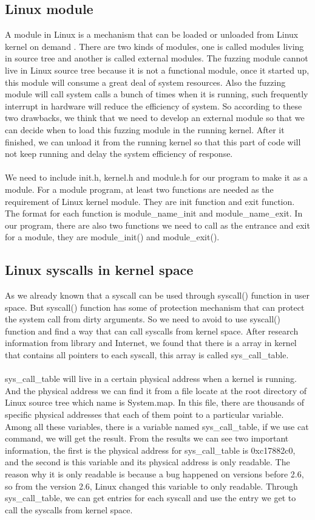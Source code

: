 \documentclass[twoside]{article}
\begin{document}
\begin{multicols}{2}
\subsection{Linux module}
A module in Linux is a mechanism that can be loaded or unloaded from Linux kernel on demand \cite{love2010linux}. There are two kinds of modules, one is called modules living in source tree and another is called external modules. The fuzzing module cannot live in Linux source tree because it is not a functional module, once it started up, this module will consume a great deal of system resources. Also the fuzzing module will call system calls a bunch of times when it is running, such frequently interrupt in hardware will reduce the efficiency of system. So according to these two drawbacks, we think that we need to develop an external module so that we can decide when to load this fuzzing module in the running kernel. After it finished, we can unload it from the running kernel so that this part of code will not keep running and delay the system efficiency of response.\\\\
We need to include init.h, kernel.h and module.h for our program to make it as a module. For a module program, at least two functions are needed as the requirement of Linux kernel module. They are init function and exit function. The format for each function is module\_name\_init and module\_name\_exit. In our program, there are also two functions we need to call as the entrance and exit for a module, they are module\_init() and module\_exit().
\subsection{Linux syscalls in kernel space}
As we already known that a syscall can be used through syscall() function in user space. But syscall() function has some of protection mechanism that can protect the system call from dirty arguments. So we need to avoid to use syscall() function and find a way that can call syscalls from kernel space. After research information from library and Internet, we found that there is a array in kernel that contains all pointers to each syscall, this array is called sys\_call\_table.\\\\
sys\_call\_table will live in a certain physical address when a kernel is running. And the physical address we can find it from a file locate at the root directory of Linux source tree which name is System.map. In this file, there are thousands of specific physical addresses that each of them point to a particular variable. Among all these variables, there is a variable named sys\_call\_table, if we use cat command, we will get the result. From the results we can see two important information, the first is the physical address for sys\_call\_table is 0xc17882c0, and the second is this variable and its physical address is only readable. The reason why it is only readable is because a bug happened on versions before 2.6, so from the version 2.6, Linux changed this variable to only readable. Through sys\_call\_table, we can get entries for each syscall and use the entry we get to call the syscalls from kernel space.

\end{multicols}
\end{document}
